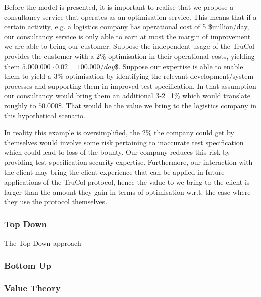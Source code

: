 Before the model is presented, it is important to realise that we propose a consultancy service that operates as an optimisation service. This means that if a certain activity, e.g. a logistics company has operational cost of 5 \$million/day, our consultancy service is only able to earn at most the margin of improvement we are able to bring our customer. Suppose the independent usage of the TruCol provides the customer with a 2\% optimisation in their operational costs, yielding them $5.000.000\cdot 0.02=100.000/day$\$. Suppose our expertise is able to enable them to yield a 3\% optimisation by identifying the relevant development/system processes and supporting them in improved test specification. In that assumption our consultancy would bring them an additional 3-2=1\% which would translate roughly to $50.000$\$. That would be the value we bring to the logistics company in this hypothetical scenario.

In reality this example is oversimplified, the 2\% the company could get by themselves would involve some risk pertaining to inaccurate test specification which could lead to loss of the bounty. Our company reduces this risk by providing test-specification security expertise. Furthermore, our interaction with the client may bring the client experience that can be applied in future applications of the TruCol protocol, hence the value to we bring to the client is larger than the amount they gain in terms of optimisation w.r.t. the case where they use the protocol themselves.



\subsubsection{Top Down}\label{subsubsec:model_descriptions_top_down}
The Top-Down approach 
\subsubsection{Bottom Up}\label{subsubsec:model_descriptions_bottom_up}
\subsubsection{Value Theory}\label{subsubsec:model_descriptions_value_theory}